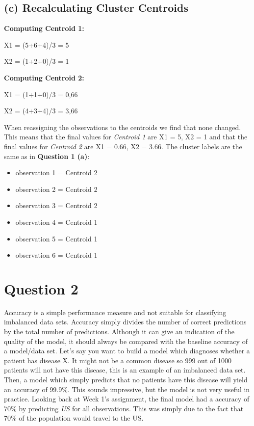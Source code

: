 \documentclass[]{article}
\providecommand{\tightlist}{%
  \setlength{\itemsep}{0pt}\setlength{\parskip}{0pt}}
\begin{document}
\subsection{(c) Recalculating Cluster
Centroids}\label{c-recalculating-cluster-centroids}

\textbf{Computing Centroid 1:}

X1 = (5+6+4)/3 = 5

X2 = (1+2+0)/3 = 1

\textbf{Computing Centroid 2:}

X1 = (1+1+0)/3 = 0,66

X2 = (4+3+4)/3 = 3,66

When reassigning the observations to the centroids we find that none
changed. This means that the final values for \emph{Centroid 1} are X1 =
5, X2 = 1 and that the final values for \emph{Centroid 2} are X1 = 0.66,
X2 = 3.66. The cluster labels are the same as in \textbf{Question 1
(a)}:

\begin{itemize}
\tightlist
\item
  observation 1 = Centroid 2
\item
  observation 2 = Centroid 2
\item
  observation 3 = Centroid 2
\item
  observation 4 = Centroid 1
\item
  observation 5 = Centroid 1
\item
  observation 6 = Centroid 1
\end{itemize}

\section{Question 2}\label{question-2}

Accuracy is a simple performance measure and not suitable for
classifying imbalanced data sets. Accuracy simply divides the number of
correct predictions by the total number of predictions. Although it can
give an indication of the quality of the model, it should always be
compared with the baseline accuracy of a model/data set. Let's say you
want to build a model which diagnoses whether a patient has disease X.
It might not be a common disease so 999 out of 1000 patients will not
have this disease, this is an example of an imbalanced data set. Then, a
model which simply predicts that no patients have this disease will
yield an accuracy of 99.9\%. This sounds impressive, but the model is
not very useful in practice. Looking back at Week 1's assignment, the
final model had a accuracy of 70\% by predicting \emph{US} for all
observations. This was simply due to the fact that 70\% of the
population would travel to the US.
\end{document}
